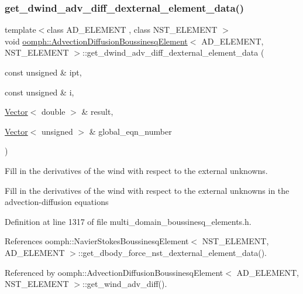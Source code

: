 \subsubsection{\texorpdfstring{get\+\_\+dwind\+\_\+adv\+\_\+diff\+\_\+dexternal\+\_\+element\+\_\+data()}{get\_dwind\_adv\_diff\_dexternal\_element\_data()}}
{\footnotesize\ttfamily template$<$class A\+D\+\_\+\+E\+L\+E\+M\+E\+NT , class N\+S\+T\+\_\+\+E\+L\+E\+M\+E\+NT $>$ \\
void \hyperlink{classoomph_1_1AdvectionDiffusionBoussinesqElement}{oomph\+::\+Advection\+Diffusion\+Boussinesq\+Element}$<$ A\+D\+\_\+\+E\+L\+E\+M\+E\+NT, N\+S\+T\+\_\+\+E\+L\+E\+M\+E\+NT $>$\+::get\+\_\+dwind\+\_\+adv\+\_\+diff\+\_\+dexternal\+\_\+element\+\_\+data (\begin{DoxyParamCaption}\item[{const unsigned \&}]{ipt,  }\item[{const unsigned \&}]{i,  }\item[{\hyperlink{classoomph_1_1Vector}{Vector}$<$ double $>$ \&}]{result,  }\item[{\hyperlink{classoomph_1_1Vector}{Vector}$<$ unsigned $>$ \&}]{global\+\_\+eqn\+\_\+number }\end{DoxyParamCaption})}



Fill in the derivatives of the wind with respect to the external unknowns. 

Fill in the derivatives of the wind with respect to the external unknowns in the advection-\/diffusion equations 

Definition at line 1317 of file multi\+\_\+domain\+\_\+boussinesq\+\_\+elements.\+h.



References oomph\+::\+Navier\+Stokes\+Boussinesq\+Element$<$ N\+S\+T\+\_\+\+E\+L\+E\+M\+E\+N\+T, A\+D\+\_\+\+E\+L\+E\+M\+E\+N\+T $>$\+::get\+\_\+dbody\+\_\+force\+\_\+nst\+\_\+dexternal\+\_\+element\+\_\+data().



Referenced by oomph\+::\+Advection\+Diffusion\+Boussinesq\+Element$<$ A\+D\+\_\+\+E\+L\+E\+M\+E\+N\+T, N\+S\+T\+\_\+\+E\+L\+E\+M\+E\+N\+T $>$\+::get\+\_\+wind\+\_\+adv\+\_\+diff().

\mbox{\label{classoomph_1_1AdvectionDiffusionBoussinesqElement_a86ec5858acc0a562cee7bccedfecb252}} 
